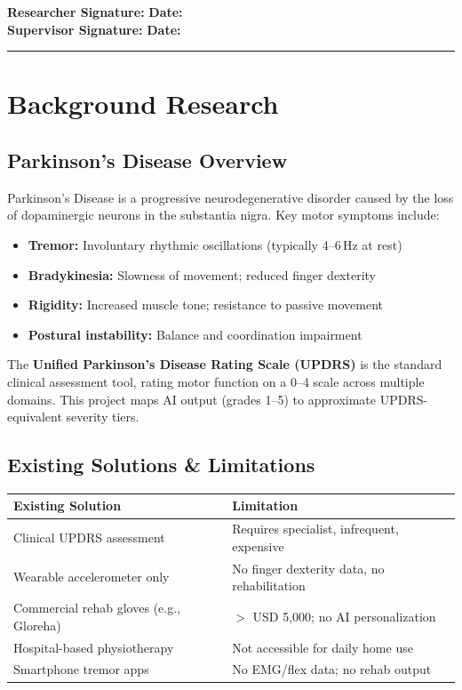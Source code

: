 \documentclass[12pt,a4paper]{article}
\newcommand{\sigblock}{%
  \vspace{0.6em}
  \noindent\textbf{Researcher Signature:} \underline{\hspace{6cm}} \quad \textbf{Date:} \underline{\hspace{3cm}}\\[0.4em]
  \noindent\textbf{Supervisor Signature:} \underline{\hspace{6cm}} \quad \textbf{Date:} \underline{\hspace{3cm}}
  \vspace{0.4em}\hrule\vspace{0.6em}
}
\begin{document}
\sigblock

\section{Background Research}

\subsection{Parkinson's Disease Overview}
Parkinson's Disease is a progressive neurodegenerative disorder caused by the loss of dopaminergic neurons in the substantia nigra. Key motor symptoms include:
\begin{itemize}
  \item \textbf{Tremor:} Involuntary rhythmic oscillations (typically 4--6\,Hz at rest)
  \item \textbf{Bradykinesia:} Slowness of movement; reduced finger dexterity
  \item \textbf{Rigidity:} Increased muscle tone; resistance to passive movement
  \item \textbf{Postural instability:} Balance and coordination impairment
\end{itemize}
The \textbf{Unified Parkinson's Disease Rating Scale (UPDRS)} is the standard clinical assessment tool, rating motor function on a 0--4 scale across multiple domains. This project maps AI output (grades 1--5) to approximate UPDRS-equivalent severity tiers.

\subsection{Existing Solutions \& Limitations}
\begin{center}
\begin{tabular}{@{}p{5.5cm} p{8.5cm}@{}}
\toprule
\textbf{Existing Solution} & \textbf{Limitation} \\
\midrule
Clinical UPDRS assessment & Requires specialist, infrequent, expensive \\
Wearable accelerometer only & No finger dexterity data, no rehabilitation \\
Commercial rehab gloves (e.g., Gloreha) & $>$ USD 5,000; no AI personalization \\
Hospital-based physiotherapy & Not accessible for daily home use \\
Smartphone tremor apps & No EMG/flex data; no rehab output \\
\bottomrule
\end{tabular}
\end{center}
\end{document}
